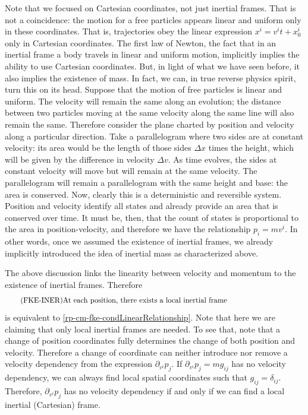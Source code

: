 Note that we focused on Cartesian coordinates, not just inertial frames. That is not a coincidence: the motion for a free particles appears linear and uniform only in these coordinates. That is, trajectories obey the linear expression $x^i = v^i t + x_0^i$ only in Cartesian coordinates. The first law of Newton, the fact that in an inertial frame a body travels in linear and uniform motion, implicitly implies the ability to use Cartesian coordinates. But, in light of what we have seen before, it also implies the existence of mass. In fact, we can, in true reverse physics spirit, turn this on its head. Suppose that the motion of free particles is linear and uniform. The velocity will remain the same along an evolution; the distance between two particles moving at the same velocity along the same line will also remain the same. Therefore consider the plane charted by  position and velocity along a particular direction. Take a parallelogram where two sides are at constant velocity: its area would be the length of those sides $\Delta x$ times the height, which will be given by the difference in velocity $\Delta v$. As time evolves, the sides at constant velocity will move but will remain at the same velocity. The parallelogram will remain a parallelogram with the same height and base: the area is conserved. Now, clearly this is a deterministic and reversible system. Position and velocity identify all states and already provide an area that is conserved over time. It must be, then, that the count of states is proportional to the area in position-velocity, and therefore we have the relationship $p_i=mv^i$. In other words, once we assumed the existence of inertial frames, we already implicitly introduced the idea of inertial mass as characterized above.

The above discussion links the linearity between velocity and momentum to the existence of inertial frames. Therefore
\begin{equation}
	\tag{FKE-INER}\label{rp-cm-fke-condInertial}
	\eqtext{At each position, there exists a local inertial frame}
\end{equation}
is equivalent to \ref{rp-cm-fke-condLinearRelationship}. Note that here we are claiming that only local inertial frames are needed. To see that, note that a change of position coordinates fully determines the change of both position and velocity. Therefore a change of coordinate can neither introduce nor remove a velocity dependency from the expression $\partial_{v^i} p_j$. If $\partial_{v^i} p_j = m g_{ij}$ has no velocity dependency, we can always find local spatial coordinates such that $g_{ij}=\delta_{ij}$. Therefore, $\partial_{v^i} p_j$ has no velocity dependency if and only if we can find a local inertial (Cartesian) frame.

